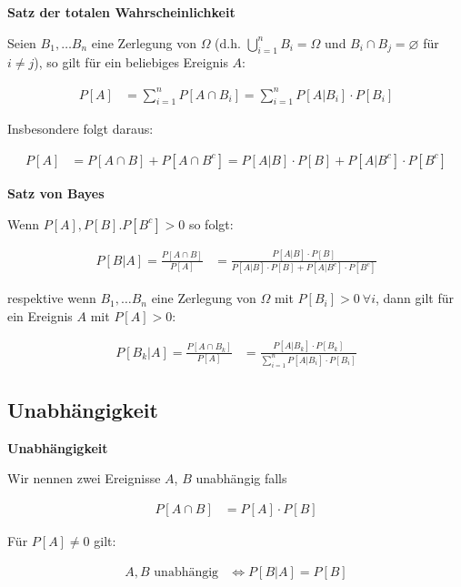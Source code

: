 \documentclass[25pt]{sciposter}
\newenvironment{method}[1]{\begin{mdframed}[backgroundcolor=blue!10,innertopmargin=15pt, innerbottommargin=15pt,nobreak=true]
		\textbf{#1 }
	}
	{ 
	\end{mdframed}
}
\newenvironment{thm}[1]{\begin{mdframed}[backgroundcolor=pink!20,innertopmargin=15pt, innerbottommargin=15pt, nobreak=true]
		\textbf{#1 }
	}
	{ 
	\end{mdframed}
}
\begin{document}
\begin{multicols}{3}
		\begin{thm}{Satz der totalen Wahrscheinlichkeit}
			Seien $B_1, \ldots B_n$ eine Zerlegung von $\Omega$ (d.h. $\bigcup_{i=1}^n B_i = \Omega$ und $B_i \cap B_j = \varnothing$ für $i\neq j$), so gilt für ein beliebiges Ereignis $A$:
			
			\begin{align*}
				P[A] &= \sum_{i=1}^{n} P[A\cap B_i] = \sum_{i=1}^{n} P[A|B_i]\cdot P[B_i]
			\end{align*}
			
			Insbesondere folgt daraus:
			
			\begin{align*}
				P[A] &= P[A\cap B] + P[A \cap B^c] = P[A|B]\cdot P[B] + P[A|B^c]\cdot P[B^c]
			\end{align*}
		\end{thm}
		
		
		\begin{thm}{Satz von Bayes}
			Wenn $P[A],P[B].P[B^c]> 0$ so folgt:
			
			\begin{align*}
				P[B|A] = \frac{P[A\cap B]}{P[A]} &= \frac{P[A|B]\cdot P[B]}{P[A|B]\cdot P[B] + P[A|B^c]\cdot P[B^c]}
			\end{align*}
			
			respektive wenn $B_1, \ldots B_n$ eine Zerlegung von $\Omega$ mit $P[B_i]>0 \  \forall i$, dann gilt für ein Ereignis $A$ mit $P[A]>0$:
			
			\begin{align*}
				P[B_k|A] = \frac{P[A\cap B_k]}{P[A]} &= \frac{P[A|B_k]\cdot P[B_k]}{\sum_{i=1}^{n} P[A|B_i] \cdot P[B_i] }
			\end{align*}
		\end{thm}
		
		
		\subsection*{Unabhängigkeit}
		
		\begin{method}{Unabhängigkeit}
			Wir nennen zwei Ereignisse $A$, $B$ unabhängig falls
			
			\begin{align*}
				P[A\cap B] &= P[A] \cdot P[B]
			\end{align*}
			
			Für $P[A] \neq 0$ gilt:
			
			\begin{align*}
				\text{$A,B$ unabhängig} &\iff P[B|A] = P[B]
			\end{align*}
			

\end{method}
\end{multicols}
\end{document}
